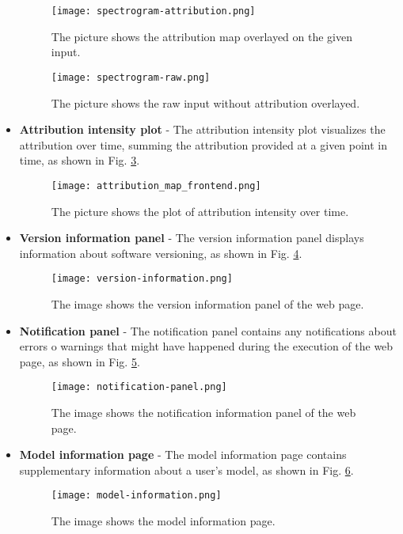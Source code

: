 \documentclass[
    bindingoffset=5mm,  %
    footnoteindent=3mm, %
    hyphenation=true    %
]{src/wut-thesis}
\begin{document}
\begin{itemize}
\begin{figure}[h!]
    \centering
    \texttt{[image: spectrogram-attribution.png]}
    \caption{The picture shows the attribution map overlayed on the given input.}
    \label{fig:SpectrogramAttribution}
\end{figure}

\begin{figure}[h!]
    \centering
    \texttt{[image: spectrogram-raw.png]}
    \caption{The picture shows the raw input without attribution overlayed.}
    \label{fig:SpectrogramRaw}
\end{figure}

    \item \textbf{Attribution intensity plot} - The attribution intensity plot visualizes the
        attribution over time, summing the attribution provided at a given point
        in time, as shown in Fig. \ref{fig:AttributionPlot}.

\begin{figure}[h!]
    \centering
    \texttt{[image: attribution\_map\_frontend.png]}
    \caption{The picture shows the plot of attribution intensity over time.}
    \label{fig:AttributionPlot}
\end{figure}

    \item \textbf{Version information panel} - The version information panel displays information about
        software versioning, as shown in Fig. \ref{fig:VersionPanel}.

\begin{figure}[h!]
    \centering
    \texttt{[image: version-information.png]}
    \caption{The image shows the version information panel of the web page.}
    \label{fig:VersionPanel}
\end{figure}

    \item \textbf{Notification panel} - The notification panel contains any notifications about errors o
        warnings that might have happened during the execution of the web page,
        as shown in Fig. \ref{fig:NotificationPanel}.

\begin{figure}[h!]
    \centering
    \texttt{[image: notification-panel.png]}
    \caption{The image shows the notification information panel of the web page.}
    \label{fig:NotificationPanel}
\end{figure}

    \item \textbf{Model information page} - The model information page contains supplementary information
        about a user's model, as shown in Fig. \ref{fig:ModelInformation}.

\begin{figure}[h!]
    \centering
    \texttt{[image: model-information.png]}
    \caption{The image shows the model information page.}
    \label{fig:ModelInformation}
\end{figure}

\end{itemize}
\end{document}
